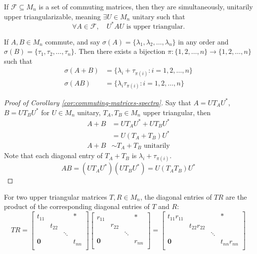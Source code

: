 \begin{theorem}
\label{thm:commuting-simul-unitarily-upper-triang}
If $\mathcal{F} \subseteq M_n$ is a set of commuting matrices, then they are simultaneously, unitarily upper triangularizable, meaning $\exists U \in M_n$ unitary such that
$$
\forall A \in \mathcal{F}, \quad U^*AU \text{ is upper triangular.}
$$
\end{theorem}

\begin{corollary}
\label{cor:commuting-matrices-spectra}
If $A, B \in M_n$ commute, and say $\sigma(A) = \{ \lambda_1, \lambda_2, \dots, \lambda_n\}$ in any order and $\sigma(B) = \{\tau_1, \tau_2, \dots, \tau_n\}$. Then there exists a bijection $\pi: \{1, 2, \dots, n\} \rightarrow \{1, 2, \dots, n\}$ such that
\begin{align*}
    \sigma(A+B) &= \{\lambda_i + \tau_{\pi(i)} : i = 1, 2, \dots, n\} \\
    \sigma(AB) &= \{\lambda_i  \tau_{\pi(i)} : i = 1, 2, \dots, n\}
\end{align*}
\end{corollary}

\begin{proof}[Proof of Corollary \ref{cor:commuting-matrices-spectra}]
Say that $A = UT_AU^*$, $B = UT_BU^*$ for $U \in M_n$ unitary, $T_A, T_B \in M_n$ upper triangular, then
\begin{align*}
    A + B &= UT_AU^* + UT_BU^* \\
          &= U(T_A+T_B)U^* \\
    A + B &\sim T_A + T_B  \text{ unitarily}
\end{align*}
Note that each diagonal entry of $T_A + T_B$ is $\lambda_i + \tau_{\pi(i)}$.
$$
AB = (UT_AU^*)(UT_BU^*) = U(T_A T_B) U^*
$$
\end{proof}

\begin{fact}
For two upper triangular matrices $T, R \in M_n$, the diagonal entries of $TR$ are the product of the corresponding diagonal entries of $T$ and $R$:
$$
TR = \begin{bmatrix}
t_{11} & & & * \\
& t_{22} & & \\
& & \ddots & \\
\mathbf{0} & & & t_{nn} \\
\end{bmatrix}
\begin{bmatrix}
r_{11} & & & * \\
& r_{22} & & \\
& & \ddots & \\
\mathbf{0} & & & r_{nn} \\
\end{bmatrix}
=
\begin{bmatrix}
t_{11}r_{11} & & & * \\
& t_{22}r_{22} & & \\
& & \ddots & \\
\mathbf{0} & & & t_{nn}r_{nn} \\
\end{bmatrix}
$$
\end{fact}

